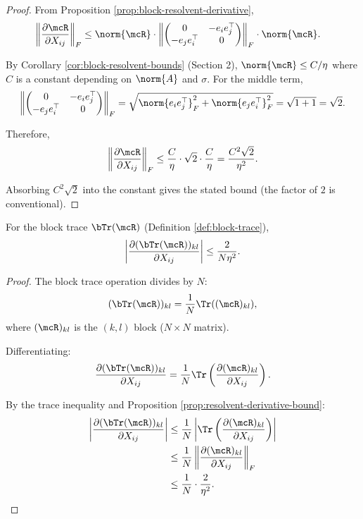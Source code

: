 \begin{proof}
From Proposition \ref{prop:block-resolvent-derivative},
\begin{align}
\left\|\frac{\partial \mcR}{\partial X_{ij}}\right\|_F
&\leq \norm{\mcR} \cdot \left\|\begin{pmatrix} 0 & -e_i e_j^\top \\ -e_j e_i^\top & 0 \end{pmatrix}\right\|_F \cdot \norm{\mcR}.
\end{align}

By Corollary \ref{cor:block-resolvent-bounds} (Section 2), $\norm{\mcR} \leq C/\eta$ where $C$ is a constant depending on $\norm{A}$ and $\sigma$. For the middle term,
\begin{align}
\left\|\begin{pmatrix} 0 & -e_i e_j^\top \\ -e_j e_i^\top & 0 \end{pmatrix}\right\|_F
= \sqrt{\norm{e_i e_j^\top}_F^2 + \norm{e_j e_i^\top}_F^2}
= \sqrt{1 + 1} = \sqrt{2}.
\end{align}

Therefore,
\begin{align}
\left\|\frac{\partial \mcR}{\partial X_{ij}}\right\|_F
\leq \frac{C}{\eta} \cdot \sqrt{2} \cdot \frac{C}{\eta} = \frac{C^2 \sqrt{2}}{\eta^2}.
\end{align}

Absorbing $C^2\sqrt{2}$ into the constant gives the stated bound (the factor of $2$ is conventional).
\end{proof}

\begin{corollary}\label{cor:block-trace-derivative-bound}
For the block trace $\bTr(\mcR)$ (Definition \ref{def:block-trace}),
\begin{equation}
\left|\frac{\partial (\bTr(\mcR))_{kl}}{\partial X_{ij}}\right| \leq \frac{2}{N\eta^2}.
\end{equation}
\end{corollary}

\begin{proof}
The block trace operation divides by $N$:
\[
(\bTr(\mcR))_{kl} = \frac{1}{N}\Tr((\mcR)_{kl}),
\]
where $(\mcR)_{kl}$ is the $(k,l)$ block ($N \times N$ matrix).

Differentiating:
\begin{align}
\frac{\partial (\bTr(\mcR))_{kl}}{\partial X_{ij}}
= \frac{1}{N} \Tr\left(\frac{\partial (\mcR)_{kl}}{\partial X_{ij}}\right).
\end{align}

By the trace inequality and Proposition \ref{prop:resolvent-derivative-bound}:
\begin{align}
\left|\frac{\partial (\bTr(\mcR))_{kl}}{\partial X_{ij}}\right|
&\leq \frac{1}{N} \left|\Tr\left(\frac{\partial (\mcR)_{kl}}{\partial X_{ij}}\right)\right| \\
&\leq \frac{1}{N} \left\|\frac{\partial (\mcR)_{kl}}{\partial X_{ij}}\right\|_F \\
&\leq \frac{1}{N} \cdot \frac{2}{\eta^2}.
\end{align}
\end{proof}

